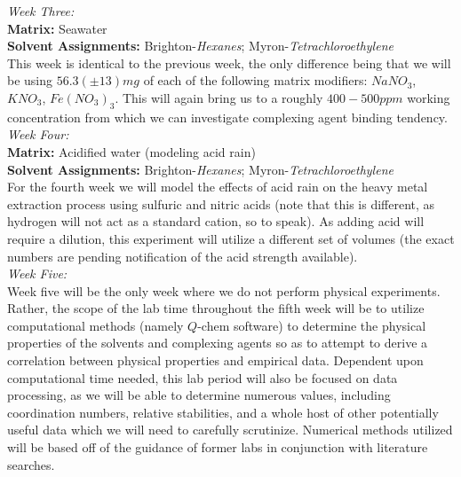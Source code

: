 \documentclass[letterpaper,12pt]{article}
\begin{document}
	\Large\emph{Week Three:}
	\tiny 
	\normalsize \\
	\textbf{Matrix:} Seawater\\
	\textbf{Solvent Assignments:} Brighton-\emph{Hexanes}; Myron-\emph{Tetrachloroethylene}\\
	\indent
	This week is identical to the previous week, the only difference being that we will be using $56.3(\pm13)mg$ of each of the following matrix modifiers: $NaNO_3$, $KNO_3$, $Fe(NO_3)_3$. This will again bring us to a roughly $400-500ppm$ working concentration from which we can investigate complexing agent binding tendency.\\
	\Large\emph{Week Four:}
	\tiny 
	\normalsize \\
	\textbf{Matrix:} Acidified water (modeling acid rain)\\
	\textbf{Solvent Assignments:} Brighton-\emph{Hexanes}; Myron-\emph{Tetrachloroethylene}\\
	\indent
	For the fourth week we will model the effects of acid rain on the heavy metal extraction process using sulfuric and nitric acids (note that this is different, as hydrogen will not act as a standard cation, so to speak). As adding acid will require a dilution, this experiment will utilize a different set of volumes (the exact numbers are pending notification of the acid strength available).\\
	\Large\emph{Week Five:}
	\tiny 
	\normalsize \\
	\indent
	Week five will be the only week where we do not perform physical experiments. Rather, the scope of the lab time throughout the fifth week will be to utilize computational methods (namely $Q$-chem software\cite{c6}) to determine the physical properties of the solvents and complexing agents so as to attempt to derive a correlation between physical properties and empirical data. Dependent upon computational time needed, this lab period will also be focused on data processing, as we will be able to determine numerous values, including coordination numbers, relative stabilities, and a whole host of other potentially useful data which we will need to carefully scrutinize. Numerical methods utilized will be based off of the guidance of former labs in conjunction with literature searches\cite{c7}\cite{c8}.
	
\end{document}
